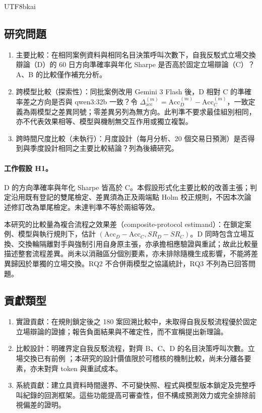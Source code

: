 \documentclass[12pt,a4paper]{article}
\newcommand{\grp}[1]{\textsf{#1}}
\begin{document}
\begin{CJK}{UTF8}{bkai}
\subsection{研究問題}

\begin{enumerate}[label=RQ\arabic*：,leftmargin=4em]
  \item 主要比較：在相同案例資料與相同名目決策呼叫次數下，自我反駁式立場交換辯論（\grp{D}）的 60 日方向準確率與年化 Sharpe 是否高於固定立場辯論（\grp{C}）？\grp{A}、\grp{B} 的比較僅作補充分析。
  \item 跨模型比較（探索性）：同批案例改用 Gemini 3 Flash 後，\grp{D} 相對 \grp{C} 的準確率差之方向是否與 qwen3:32b 一致？令 $\Delta_{\mathrm{acc}}^{(m)}=\mathrm{Acc}_{D}^{(m)}-\mathrm{Acc}_{C}^{(m)}$，一致定義為兩模型之差異同號；零差異另列為無方向。此判準不要求最佳組別相同，亦不代表效果相等、模型與機制無交互作用或獨立複製。
  \item 跨時間尺度比較（未執行）：月度設計（每月分析、20 個交易日預測）是否得到與季度設計相同之主要比較結論？列為後續研究。
\end{enumerate}

\paragraph{工作假設 H1。} \grp{D} 的方向準確率與年化 Sharpe 皆高於 \grp{C}。本假設形式化主要比較的改善主張；判定沿用既有登記的雙尾檢定、差異須為正及兩端點 Holm 校正規則，不因本次論述修訂改為單尾檢定。未達判準不等於兩組等效。

\noindent 本研究的比較量為複合流程之效果差（composite-protocol estimand）：在鎖定案例、模型與執行規則下，估計 $(\mathrm{Acc}_D-\mathrm{Acc}_C, SR_D-SR_C)$。\grp{D} 同時包含立場互換、交換輪隔離對手與強制引用自身原主張，亦承擔相應驗證與重試；故此比較量描述整套流程差異。尚未以消融區分個別要素，亦未排除隨機生成影響，不能將差異歸因於單獨的立場交換。RQ2 不合併兩模型之協議統計，RQ3 不列為已回答問題。

\subsection{貢獻類型}

\begin{enumerate}[label=\arabic*.]
  \item 實證貢獻：在規則鎖定後之 180 案回溯比較中，未取得自我反駁流程優於固定立場辯論的證據；報告負面結果與不確定性，而不宣稱提出新理論。
  \item 比較設計：明確界定自我反駁流程，對齊 \grp{B}、\grp{C}、\grp{D} 的名目決策呼叫次數。立場交換已有前例 \citep{liu2025roleswitch,chowdhury2026proclaim}；本研究的設計價值限於可稽核的機制比較，尚未分離各要素，亦未對齊 token 與重試成本。
  \item 系統貢獻：建立具資料時間邊界、不可變快照、程式與模型版本鎖定及完整呼叫紀錄的回測框架。這些功能提高可審查性，但不構成預測效力或完全排除前視偏差的證明。
\end{enumerate}


\end{CJK}
\end{document}
